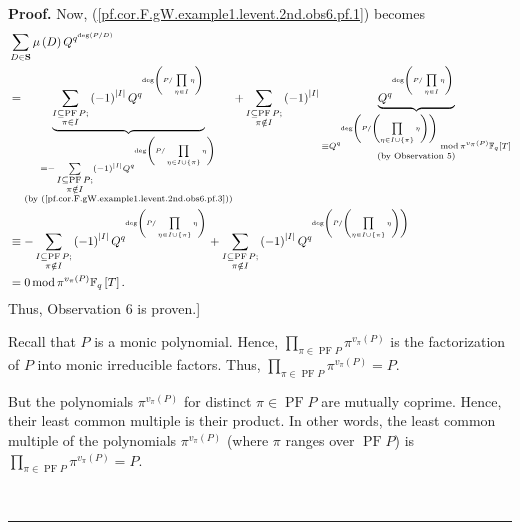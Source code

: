 \documentclass[numbers=enddot,12pt,final,onecolumn,notitlepage]{scrartcl}%
\theoremstyle{definition}
\newenvironment{proof}[1][Proof]{\noindent\textbf{#1.} }{\ \rule{0.5em}{0.5em}}
\let\sumnonlimits\sum
\let\prodnonlimits\prod
\renewcommand{\sum}{\sumnonlimits\limits}
\renewcommand{\prod}{\prodnonlimits\limits}
\begin{document}
\begin{proof}
Now, (\ref{pf.cor.F.gW.example1.levent.2nd.obs6.pf.1}) becomes%
\begin{align*}
&  \sum_{D\in\mathbf{S}}\mu\left(  D\right)  Q^{q^{\deg\left(  P/D\right)  }%
}\\
&  =\underbrace{\sum_{\substack{I\subseteq\operatorname*{PF}P;\\\pi\in
I}}\left(  -1\right)  ^{\left\vert I\right\vert }Q^{q^{\deg\left(
P/\prod_{\eta\in I}\eta\right)  }}}_{\substack{=-\sum_{\substack{I\subseteq
\operatorname*{PF}P;\\\pi\notin I}}\left(  -1\right)  ^{\left\vert
I\right\vert }Q^{q^{\deg\left(  P/\prod_{\eta\in I\cup\left\{  \pi\right\}
}\eta\right)  }}\\\text{(by (\ref{pf.cor.F.gW.example1.levent.2nd.obs6.pf.3}%
))}}}+\sum_{\substack{I\subseteq\operatorname*{PF}P;\\\pi\notin I}}\left(
-1\right)  ^{\left\vert I\right\vert }\underbrace{Q^{q^{\deg\left(
P/\prod_{\eta\in I}\eta\right)  }}}_{\substack{\equiv Q^{q^{\deg\left(
P/\left(  \prod_{\eta\in I\cup\left\{  \pi\right\}  }\eta\right)  \right)  }%
}\operatorname{mod}\pi^{v_{\pi}\left(  P\right)  }\mathbb{F}_{q}\left[
T\right]  \\\text{(by Observation 5)}}}\\
&  \equiv-\sum_{\substack{I\subseteq\operatorname*{PF}P;\\\pi\notin I}}\left(
-1\right)  ^{\left\vert I\right\vert }Q^{q^{\deg\left(  P/\prod_{\eta\in
I\cup\left\{  \pi\right\}  }\eta\right)  }}+\sum_{\substack{I\subseteq
\operatorname*{PF}P;\\\pi\notin I}}\left(  -1\right)  ^{\left\vert
I\right\vert }Q^{q^{\deg\left(  P/\left(  \prod_{\eta\in I\cup\left\{
\pi\right\}  }\eta\right)  \right)  }}\\
&  =0\operatorname{mod}\pi^{v_{\pi}\left(  P\right)  }\mathbb{F}_{q}\left[
T\right]  .
\end{align*}
Thus, Observation 6 is proven.]

Recall that $P$ is a monic polynomial. Hence, $\prod_{\pi\in\operatorname*{PF}%
P}\pi^{v_{\pi}\left(  P\right)  }$ is the factorization of $P$ into monic
irreducible factors. Thus, $\prod_{\pi\in\operatorname*{PF}P}\pi^{v_{\pi
}\left(  P\right)  }=P$.

But the polynomials $\pi^{v_{\pi}\left(  P\right)  }$ for distinct $\pi
\in\operatorname*{PF}P$ are mutually coprime. Hence, their least common
multiple is their product. In other words, the least common multiple of the
polynomials $\pi^{v_{\pi}\left(  P\right)  }$ (where $\pi$ ranges over
$\operatorname*{PF}P$) is $\prod_{\pi\in\operatorname*{PF}P}\pi^{v_{\pi
}\left(  P\right)  }=P$.


\end{proof}
\end{document}
